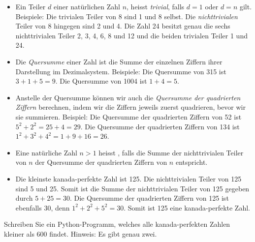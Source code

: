 \begin{mychallenge}
	\begin{itemize}
		\item Ein Teiler $d$ einer natürlichen Zahl $n$, heisst \textit{trivial}, falls $d = 1$ oder $d = n$ gilt. Beispiele: Die trivialen Teiler von 8 sind 1 und 8 selbst. Die \textit{nichttrivialen} Teiler von 8 hingegen sind 2 und 4. Die Zahl 24 besitzt genau die sechs nichttrivialen Teiler 2, 3, 4, 6, 8 und 12 und die beiden trivialen Teiler 1 und 24.
		\item Die \textit{Quersumme} einer Zahl ist die Summe der einzelnen Ziffern ihrer Darstellung im Dezimalsystem. Beispiele: Die Quersumme von 315 ist $3 + 1 + 5 = 9$. Die Quersumme von 1004 ist $1 + 4 = 5$.
		\item Anstelle der Quersumme können wir auch die \textit{Quersumme der quadrierten Ziffern} berechnen, indem wir die Ziffern jeweils zuerst quadrieren, bevor wir sie summieren. Beispiel: Die Quersumme der quadrierten Ziffern von 52 ist $5^2 + 2^2 = 25 + 4 = 29$. Die Quersumme der quadrierten Ziffern von 134 ist $1^2 + 3^2 + 4^2 = 1 + 9 + 16 = 26$.
		\item Eine natürliche Zahl $n>1$ heisst , falls die Summe der nichttrivialen Teiler von $n$ der Quersumme der quadrierten Ziffern von $n$ entspricht.
		\item Die kleinste kanada-perfekte Zahl ist 125. Die nichttrivialen Teiler von 125 sind 5 und 25. Somit ist die Summe der nichttrivialen Teiler von 125 gegeben durch $5 + 25 = 30$. Die Quersumme der quadrierten Ziffern von 125 ist ebenfalls 30, denn $1^2 + 2^2 + 5^2 = 30$. Somit ist 125 eine kanada-perfekte Zahl.
	\end{itemize}

	Schreiben Sie ein Python-Programm, welches alle kanada-perfekten Zahlen kleiner als 600 findet. Hinweis: Es gibt genau zwei.
	\begin{myanswer}
		
	\end{myanswer}
\end{mychallenge}

